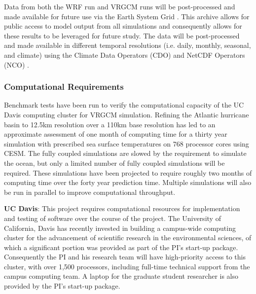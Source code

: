 \documentclass[11pt]{article}
\begin{document}
Data from both the WRF run and VRGCM runs will be post-processed and made available for future use via the Earth System Grid \citep{williams2009earth}. This archive allows for public access to model output from all simulations and consequently allows for these results to be leveraged for future study.  The data will be post-processed and made available in different temporal resolutions (i.e. daily, monthly, seasonal, and climate) using the Climate Data Operators (CDO) and NetCDF Operators (NCO) \citep{schulzweida2007cdo,zender2006netcdf}. 

\subsubsection{Computational Requirements}
Benchmark tests have been run to verify the computational capacity of the UC Davis computing cluster for VRGCM simulation. Refining the Atlantic hurricane basin to 12.5km resolution over a 110km base resolution has led to an approximate assessment of one month of computing time for a thirty year simulation with prescribed sea surface temperatures on 768 processor cores using CESM. The fully coupled simulations are slowed by the requirement to simulate the ocean, but only a limited number of fully coupled simulations will be required. These simulations have been projected to require roughly two months of computing time over the forty year prediction time. Multiple simulations will also be run in parallel to improve computational throughput.

\textbf{UC Davis}:  This project requires computational resources for implementation and testing of software over the course of the project. The University of California, Davis has recently invested in building a campus-wide computing cluster for the advancement of scientific research in the environmental sciences, of which a significant portion was provided as part of the PI’s start-up package. Consequently the PI and his research team will have high-priority access to this cluster, with over 1,500 processors, including full-time technical support from the campus computing team. A laptop for the graduate student researcher is also provided by the PI’s start-up package.
\end{document}
